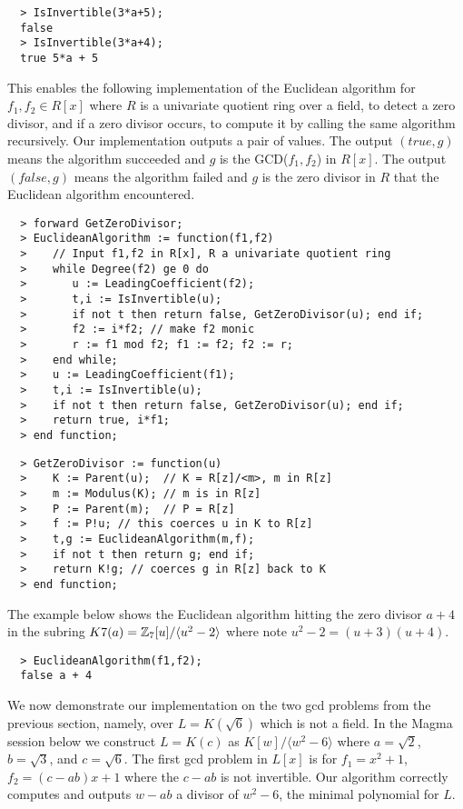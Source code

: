 \documentclass[10pt]{article}
\begin{document}
{ \small
\begin{verbatim}
  > IsInvertible(3*a+5);
  false
  > IsInvertible(3*a+4);
  true 5*a + 5
\end{verbatim}
}

\noindent This enables the following implementation of the Euclidean
algorithm for $f_1, f_2 \in R[x]$ where $R$ is a univariate quotient
ring over a field, to detect a zero divisor, and if a zero divisor
occurs, to compute it by calling the same algorithm recursively. Our
implementation outputs a pair of values. The output $(true,g)$ means
the algorithm succeeded and $g$ is the GCD($f_1,f_2$) in $R[x]$. The
output $(false,g)$ means the algorithm failed and $g$ is the zero
divisor in $R$ that the Euclidean algorithm encountered.

{ \small
\begin{verbatim}
  > forward GetZeroDivisor;
  > EuclideanAlgorithm := function(f1,f2)
  >    // Input f1,f2 in R[x], R a univariate quotient ring
  >    while Degree(f2) ge 0 do
  >       u := LeadingCoefficient(f2);
  >       t,i := IsInvertible(u);
  >       if not t then return false, GetZeroDivisor(u); end if;
  >       f2 := i*f2; // make f2 monic
  >       r := f1 mod f2; f1 := f2; f2 := r;
  >    end while;
  >    u := LeadingCoefficient(f1);
  >    t,i := IsInvertible(u);
  >    if not t then return false, GetZeroDivisor(u); end if;
  >    return true, i*f1;
  > end function;
\end{verbatim}
\begin{verbatim}
  > GetZeroDivisor := function(u)
  >    K := Parent(u);  // K = R[z]/<m>, m in R[z]
  >    m := Modulus(K); // m is in R[z]
  >    P := Parent(m);  // P = R[z]
  >    f := P!u; // this coerces u in K to R[z]
  >    t,g := EuclideanAlgorithm(m,f);
  >    if not t then return g; end if;
  >    return K!g; // coerces g in R[z] back to K
  > end function;
\end{verbatim}
}


\noindent
The example below shows the Euclidean algorithm hitting
the zero divisor $a+4$ in the subring $K7(a) = {\mathbb Z}_7[u]/\langle u^2-2 \rangle$
where note $u^2-2 = (u+3) (u+4)$.

{ \small
\begin{verbatim}
  > EuclideanAlgorithm(f1,f2);
  false a + 4
\end{verbatim}
}

\noindent
We now demonstrate our implementation on the two gcd problems
from the previous section, namely, over $L = K(\sqrt 6)$ which
is not a field.  In the Magma session below we construct $L = K(c)$
as $K[w]/\langle w^2-6 \rangle$ where $a=\sqrt 2$, $b = \sqrt 3$, and $c = \sqrt 6$.
The first gcd problem in $L[x]$ is for $f_1 = x^2+1$, $f_2 = (c-ab) x + 1$
where the $c - a b$ is not invertible.
Our algorithm correctly computes and outputs $w-a b$ a divisor
of $w^2-6$, the minimal polynomial for $L$.
\end{document}
